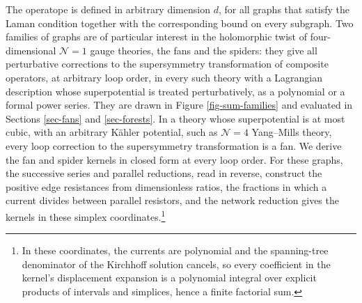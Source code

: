 \documentclass[11pt]{article}
\numberwithin{equation}{section}
\numberwithin{figure}{section}
\numberwithin{table}{section}
\begin{document}
The operatope is defined in arbitrary dimension $d$, for all graphs that satisfy the Laman condition together with the corresponding bound on every subgraph. Two families of graphs are of particular interest in the holomorphic twist of four-dimensional $\mathcal N=1$ gauge theories, the fans and the spiders: they give all perturbative corrections to the supersymmetry transformation of composite operators, at arbitrary loop order, in every such theory with a Lagrangian description whose superpotential is treated perturbatively, as a polynomial or a formal power series. They are drawn in Figure \ref{fig-sum-families} and evaluated in Sections \ref{sec-fans} and \ref{sec-forests}. In a theory whose superpotential is at most cubic, with an arbitrary K\"ahler potential, such as $\mathcal N=4$ Yang--Mills theory, every loop correction to the supersymmetry transformation is a fan. We derive the fan and spider kernels in closed form at every loop order. For these graphs, the successive series and parallel reductions, read in reverse, construct the positive edge resistances from dimensionless ratios, the fractions in which a current divides between parallel resistors, and the network reduction gives the kernels in these simplex coordinates.\footnote{In these coordinates, the currents are polynomial and the spanning-tree denominator of the Kirchhoff solution cancels, so every coefficient in the kernel's displacement expansion is a polynomial integral over explicit products of intervals and simplices, hence a finite factorial sum.}
\end{document}
